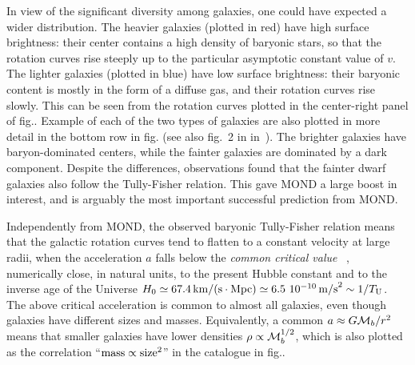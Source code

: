 In view of the significant diversity among galaxies, one could have expected a wider distribution.
The heavier galaxies (plotted in red) have high surface brightness:
their center contains a high density of baryonic stars,
so that the rotation curves rise steeply up to the particular asymptotic  constant  value of $v$.
The lighter galaxies (plotted in blue) have low surface brightness:
their baryonic content is mostly in the form of a diffuse gas, and their rotation curves rise slowly.
This can be seen from the rotation curves plotted in the center-right panel of fig..
Example of each of the two types of galaxies are also plotted in more detail in
the bottom row in fig.
(see also fig.~2 in  in~\cite{DMvsa0}).
The brighter galaxies have baryon-dominated centers, while the fainter galaxies are dominated by a dark component.
Despite the differences, observations found that the fainter 
dwarf galaxies also follow the Tully-Fisher relation. 
This gave MOND a large boost in interest, and
is arguably the most important successful prediction from MOND.

\smallskip

Independently from MOND, the observed baryonic Tully-Fisher relation means that
the galactic rotation curves 
tend to flatten to a constant velocity
at large radii,
when the acceleration $a $ falls below the {\em common critical value}
\beq  \label{eq:aMOND}
~,
\eeq
numerically close, in natural units, to the present Hubble constant and to the inverse age of the Universe 
$H_0 \simeq 67.4 \,{\rm km/(s}\cdot{\rm Mpc)} \simeq 6.5~10^{-10} \, {\rm m/s}^2   \sim 1/T_{\rm U}$.
The above critical acceleration is common to almost all galaxies, 
even though galaxies have different sizes and masses.
Equivalently,  a common $a \approx G {\cal M}_b/r^2$ means that smaller galaxies have lower
densities $\rho \propto {\cal M}_b^{1/2}$, which is
also plotted as the correlation ``$\hbox{mass}\propto \hbox{size}^2$'' in the catalogue in fig..



